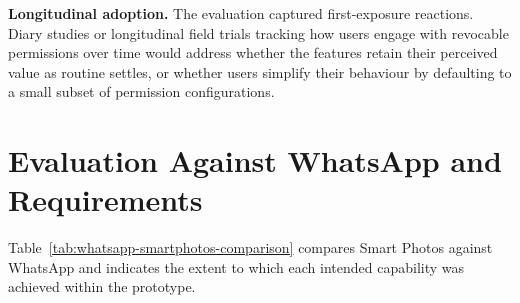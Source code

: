 \textbf{Longitudinal adoption.} The evaluation captured first-exposure reactions. Diary studies or longitudinal field trials tracking how users engage with revocable permissions over time would address whether the features retain their perceived value as routine settles, or whether users simplify their behaviour by defaulting to a small subset of permission configurations.




\section{Evaluation Against WhatsApp and Requirements}

Table~\ref{tab:whatsapp-smartphotos-comparison} compares Smart Photos against WhatsApp and indicates the extent to which each intended capability was achieved within the prototype.

